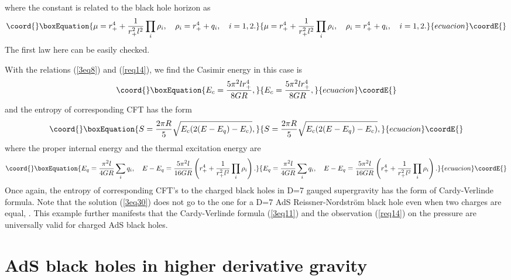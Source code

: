 \documentclass[a4paper,12pt]{article}
\providecommand{\sect}[1]{\setcounter{equation}{0}\section{#1}}
\begin{document}
where the constant \myHighlight{$\mu$}\coordHE{} is related to the black hole horizon \coordHE{} as
\begin{equation}\coord{}\boxEquation{
\mu = r_+^4 +\frac{1}{r_+^2 l^2}\prod_i \rho_i,
 \ \ \ \rho_i = r_+^4 +q_i, \ \ \  i=1, 2.
}{
\mu = r_+^4 +\frac{1}{r_+^2 l^2}\prod_i \rho_i,
 \ \ \ \rho_i = r_+^4 +q_i, \ \ \  i=1, 2.
}{ecuacion}\coordE{}\end{equation}
The first law  here \coordHE{} can be 
easily checked.    

With the relations (\ref{3eq8}) and (\ref{req14}), we find the Casimir energy 
in this case is
\begin{equation}\coord{}\boxEquation{
E_c =\frac{5\pi^2 lr_+^4}{8GR},
}{
E_c =\frac{5\pi^2 lr_+^4}{8GR},
}{ecuacion}\coordE{}\end{equation}
and the entropy of corresponding CFT has the form
\begin{equation}\coord{}\boxEquation{
\label{3eq36}
S=\frac{2\pi R}{5} \sqrt{E_c(2(E-E_q)-E_c)},
}{
S=\frac{2\pi R}{5} \sqrt{E_c(2(E-E_q)-E_c)},
}{ecuacion}\coordE{}\end{equation}
where the proper internal energy and the thermal excitation  energy are
\begin{equation}\coord{}\boxEquation{
E_q =\frac{\pi^2 l}{4GR}\sum_i q_i, \ \ \  E-E_q=\frac{5\pi^2 l}{16 GR}
  \left( r_+^4 +\frac{1}{r_+^2 l^2}\prod_i \rho_i \right ).
}{
E_q =\frac{\pi^2 l}{4GR}\sum_i q_i, \ \ \  E-E_q=\frac{5\pi^2 l}{16 GR}
  \left( r_+^4 +\frac{1}{r_+^2 l^2}\prod_i \rho_i \right ).
}{ecuacion}\coordE{}\end{equation}
Once again, the entropy of corresponding CFT's to the charged black holes
in D=7 gauged supergravity has the form of Cardy-Verlinde formula. 
Note that the solution (\ref{3eq30}) does not go to the one for a D=7 AdS 
Reissner-Nordstr\"om black hole even when two charges are equal, \coordHE{}. 
This example further manifests that the Cardy-Verlinde formula (\ref{3eq11})
and the observation (\ref{req14}) on the pressure are universally valid
for charged AdS black holes.    



  





\sect{AdS black holes in higher derivative gravity}
\end{document}
